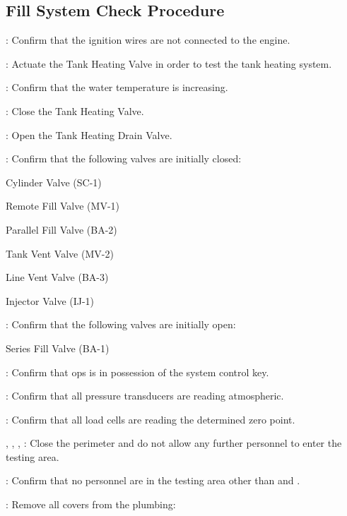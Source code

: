 \subsection{Fill System Check Procedure}
\begin{checklist}
    \item \secondary{}: Confirm that the ignition wires are not connected to the engine.
    \item \control{}: Actuate the Tank Heating Valve in order to test the tank heating system. 
    \item \daq{}: Confirm that the water temperature is increasing. 
    \item \control{}: Close the Tank Heating Valve. 
    \item \primary{}: Open the Tank Heating Drain Valve.
    \item \primary{}: Confirm that the following valves are initially closed:
    \begin{checklist}
    		\item Cylinder Valve (SC-1)
    		\item Remote Fill Valve (MV-1)
    		\item Parallel Fill Valve (BA-2)
    		\item Tank Vent Valve (MV-2)
    		\item Line Vent Valve (BA-3)
    		\item Injector Valve (IJ-1)
    	\end{checklist}
    	\item \primary{}: Confirm that the following valves are initially open:
    	\begin{checklist}
    		\item Series Fill Valve (BA-1)
    	\end{checklist}
    	\item \ops{}: Confirm that ops is in possession of the system control key.
    	\item \daq{}: Confirm that all pressure transducers are reading atmospheric. 
    	\item \daq{}: Confirm that all load cells are reading the determined zero point.
    	\item \peri{}, \perii{}, \periii{}, \periv{}: Close the perimeter and do not allow any further personnel to enter the testing area. 
    	\item \secondary{}: Confirm that no personnel are in the testing area other than \primary{} and \secondary{}.
    	\item \primary{}: Remove all covers from the plumbing:

\end{checklist}
